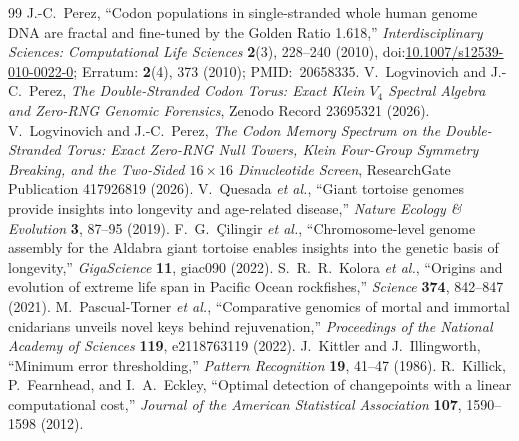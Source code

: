 \documentclass[11pt,a4paper]{article}
\renewcommand{\_}{\origunderscore\penalty200\relax}
\theoremstyle{remark}
\begin{document}
\begin{thebibliography}{99}
 J.-C.~Perez, ``Codon populations in single-stranded whole human genome DNA are fractal and fine-tuned by the Golden Ratio 1.618,'' \textit{Interdisciplinary Sciences: Computational Life Sciences} \textbf{2}(3), 228--240 (2010), doi:\href{https://doi.org/10.1007/s12539-010-0022-0}{10.1007/s12539-010-0022-0}; Erratum: \textbf{2}(4), 373 (2010); PMID:~20658335.
 V.~Logvinovich and J.-C.~Perez, \textit{The Double-Stranded Codon Torus: Exact Klein $V_4$ Spectral Algebra and Zero-RNG Genomic Forensics}, Zenodo Record 23695321 (2026).
 V.~Logvinovich and J.-C.~Perez, \textit{The Codon Memory Spectrum on the Double-Stranded Torus: Exact Zero-RNG Null Towers, Klein Four-Group Symmetry Breaking, and the Two-Sided $16\times 16$ Dinucleotide Screen}, ResearchGate Publication 417926819 (2026).
 V.~Quesada \textit{et al.}, ``Giant tortoise genomes provide insights into longevity and age-related disease,'' \textit{Nature Ecology \& Evolution} \textbf{3}, 87--95 (2019).
 F.~G.~\c{C}ilingir \textit{et al.}, ``Chromosome-level genome assembly for the Aldabra giant tortoise enables insights into the genetic basis of longevity,'' \textit{GigaScience} \textbf{11}, giac090 (2022).
 S.~R.~R.~Kolora \textit{et al.}, ``Origins and evolution of extreme life span in Pacific Ocean rockfishes,'' \textit{Science} \textbf{374}, 842--847 (2021).
 M.~Pascual-Torner \textit{et al.}, ``Comparative genomics of mortal and immortal cnidarians unveils novel keys behind rejuvenation,'' \textit{Proceedings of the National Academy of Sciences} \textbf{119}, e2118763119 (2022).
 J.~Kittler and J.~Illingworth, ``Minimum error thresholding,'' \textit{Pattern Recognition} \textbf{19}, 41--47 (1986).
 R.~Killick, P.~Fearnhead, and I.~A.~Eckley, ``Optimal detection of changepoints with a linear computational cost,'' \textit{Journal of the American Statistical Association} \textbf{107}, 1590--1598 (2012).
\end{thebibliography}
\end{document}
